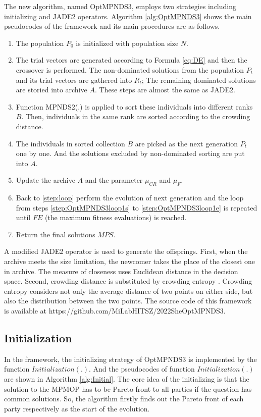 \documentclass[preprint,12pt]{elsarticle}
\begin{document}
The new algorithm, named OptMPNDS3, employs two strategies including initializing and JADE2 operators.
Algorithm \ref{alg:OptMPNDS3} shows the main pseudocodes of the framework and its main procedures are as follows.
\begin{enumerate}[(1)]
	\item The population $P_0$ is initialized with population size $N$.
	\item \label{step:loop} The trial vectors are generated according to Formula \eqref{eq:DE} and then the crossover is performed.
	      The non-dominated solutions from the population $P_t$ and its trial vectors are gathered into $R_t$;
	      The remaining dominated solutions are storied into archive $A$.
	      These steps are almost the same as JADE2.
	\item Function MPNDS2(.) is applied to sort these individuals into different ranks $B$.
	      Then, individuals in the same rank are sorted according to the crowding distance.
	\item The individuals in sorted collection $B$ are picked as the next generation $P_t$ one by one.
	      And the solutions excluded by non-dominated sorting are put into $A$.
	\item Update the archive $A$ and the parameter $\mu_{CR}$ and $\mu_F$.
	\item Back to \eqref{step:loop} perform the evolution of next generation and the loop from steps \ref{step:OptMPNDS3loop1s} to \ref{step:OptMPNDS3loop1e} is repeated until $FE$ (the maximum fitness evaluations) is reached.
	\item Return the final solutions $MPS$.
\end{enumerate}

A modified JADE2 operator is used to generate the offsprings.
First, when the archive meets the size limitation, the newcomer takes the place of the closest one in archive.
The measure of closeness uses Euclidean distance in the decision space.
Second, crowding distance is substituted by crowding entropy \cite{Wang2010}.
Crowding entropy considers not only the average distance of two points on either side, but also the distribution between the two points.
The source code of this framework is available at https://github.com/MiLabHITSZ/2022SheOptMPNDS3.
\subsection{Initialization}

In the framework, the initializing strategy of OptMPNDS3 is implemented by the function $Initialization(.)$.
And the pseudocodes of function $Initialization(.)$ are shown in Algorithm \ref{alg:Initial}.
The core idea of the initializing is that the solution to the MPMOP has to be Pareto front to all parties if the question has common solutions.
So, the algorithm firstly finds out the Pareto front of each party respectively as the start of the evolution.
\end{document}
